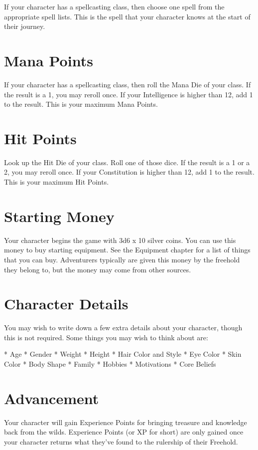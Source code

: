 \begin{multicols}{2}
If your character has a spellcasting class, then choose one spell from the
appropriate spell lists. This is the spell that your character knows at
the start of their journey.

\section{Mana Points}

If your character has a spellcasting class, then roll the Mana Die of your
class. If the result is a 1, you may reroll once. If your Intelligence
is higher than 12, add 1 to the result. This is your maximum Mana Points.

\section{Hit Points}

Look up the Hit Die of your class. Roll one of those dice. If the result is a
1 or a 2, you may reroll once. If your Constitution is higher than 12, add 1
to the result. This is your maximum Hit Points.

\section{Starting Money}

Your character begins the game with 3d6 x 10 silver coins. You can use this
money to buy starting equipment. See the Equipment chapter for a list of
things that you can buy. Adventurers typically are given this money by the
freehold they belong to, but the money may come from other sources.

\section{Character Details}

You may wish to write down a few extra details about your character, though
this is not required. Some things you may wish to think about are:

* Age
* Gender
* Weight
* Height
* Hair Color and Style
* Eye Color
* Skin Color
* Body Shape
* Family
* Hobbies
* Motivations
* Core Beliefs

\section{Advancement}

Your character will gain Experience Points for bringing treasure and knowledge
back from the wilds. Experience Points (or XP for short) are only gained once
your character returns what they've found to the rulership of their Freehold.


\end{multicols}
